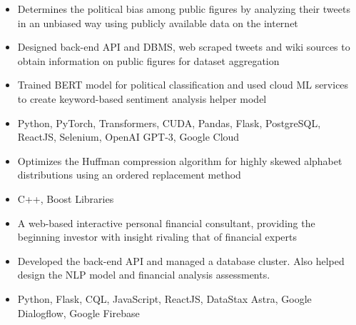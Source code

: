 \documentclass[11pt,letterpaper]{article}
\begin{document}
    \begin{itemize}
      \item{Determines the political bias among public figures by analyzing their tweets in an unbiased way using publicly available data on the internet}
      \item{Designed back-end API and DBMS, web scraped tweets and wiki sources to obtain information on public figures for dataset aggregation}
      \item{Trained BERT model for political classification and used cloud ML services to create keyword-based sentiment analysis helper model}
      \item{
        {}
        Python, PyTorch, Transformers, CUDA, Pandas, Flask, PostgreSQL, ReactJS, Selenium, OpenAI GPT-3, Google Cloud
      }
    \end{itemize}
  \fi

  \ifhuffskew
    {\fontsize{12}{12}}

    \begin{itemize}
      \item{Optimizes the Huffman compression algorithm for highly skewed alphabet distributions using an ordered replacement method}
      \item{
        {}
        C++, Boost Libraries
      }
    \end{itemize}
  \fi

  \iffizz
    {\fontsize{12}{12}}

    \begin{itemize}
      \item{A web-based interactive personal financial consultant, providing the beginning investor with insight rivaling that of financial experts}
      \item{Developed the back-end API and managed a database cluster. Also helped design the NLP model and financial analysis assessments.}
      \item{
        {}
        Python, Flask, CQL, JavaScript, ReactJS, DataStax Astra, Google Dialogflow, Google Firebase
      }
    \end{itemize}
  \fi
\end{document}
